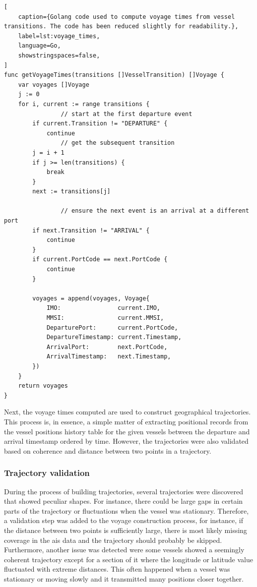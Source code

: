 \begin{lstlisting}[
    caption={Golang code used to compute voyage times from vessel transitions. The code has been reduced slightly for readability.},
    label=lst:voyage_times,
    language=Go,
    showstringspaces=false,
]
func getVoyageTimes(transitions []VesselTransition) []Voyage {
	var voyages []Voyage
	j := 0
	for i, current := range transitions {
                // start at the first departure event
		if current.Transition != "DEPARTURE" {
			continue
                // get the subsequent transition
		j = i + 1
		if j >= len(transitions) {
			break
		}
		next := transitions[j]

                // ensure the next event is an arrival at a different port
		if next.Transition != "ARRIVAL" {
			continue
		}
		if current.PortCode == next.PortCode {
			continue
		}

		voyages = append(voyages, Voyage{
			IMO:                current.IMO,
			MMSI:               current.MMSI,
			DeparturePort:      current.PortCode,
			DepartureTimestamp: current.Timestamp,
			ArrivalPort:        next.PortCode,
			ArrivalTimestamp:   next.Timestamp,
		})
	}
	return voyages
}
\end{lstlisting}

Next, the voyage times computed are used to construct geographical trajectories. This process is, in essence, a simple matter of extracting positional records from the vessel positions history table for the given vessels between the departure and arrival timestamp ordered by time. However, the trajectories were also validated based on coherence and distance between two points in a trajectory.

\subsubsection{Trajectory validation}

During the process of building trajectories, several trajectories were discovered that showed peculiar shapes. For instance, there could be large gaps in certain parts of the trajectory or fluctuations when the vessel was stationary. Therefore, a validation step was added to the voyage construction process, for instance, if the distance between two points is sufficiently large, there is most likely missing coverage in the \acrshort{ais} data and the trajectory should probably be skipped. Furthermore, another issue was detected were some vessels showed a seemingly coherent trajectory except for a section of it where the longitude or latitude value fluctuated with extreme distances. This often happened when a vessel was stationary or moving slowly and it transmitted many positions closer together.

